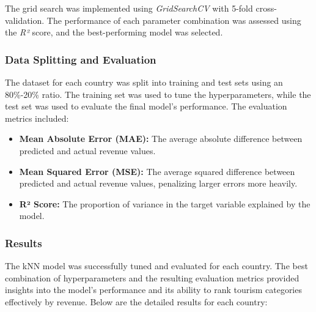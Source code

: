 \documentclass{article}
\begin{document}
The grid search was implemented using \textit{GridSearchCV} with 5-fold cross-validation. The performance of each parameter combination was assessed using the \textit{R²} score, and the best-performing model was selected.

\subsubsection{Data Splitting and Evaluation}

The dataset for each country was split into training and test sets using an 80\%-20\% ratio. The training set was used to tune the hyperparameters, while the test set was used to evaluate the final model's performance. The evaluation metrics included:
\begin{itemize}
    \item \textbf{Mean Absolute Error (MAE):} The average absolute difference between predicted and actual revenue values.
    \item \textbf{Mean Squared Error (MSE):} The average squared difference between predicted and actual revenue values, penalizing larger errors more heavily.
    \item \textbf{R² Score:} The proportion of variance in the target variable explained by the model.
\end{itemize}

\subsubsection{Results}

The kNN model was successfully tuned and evaluated for each country. The best combination of hyperparameters and the resulting evaluation metrics provided insights into the model's performance and its ability to rank tourism categories effectively by revenue. Below are the detailed results for each country:
\end{document}
